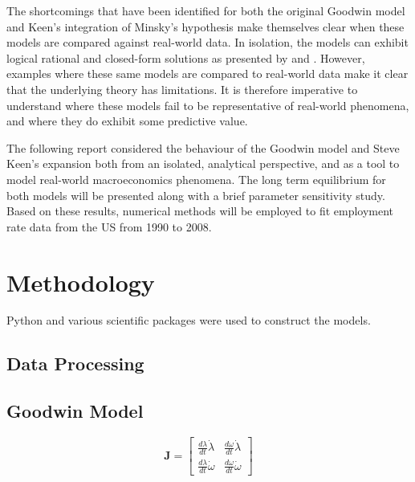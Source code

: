 \documentclass[12pt, centerh1]{article}
\begin{document}

\noindent The shortcomings that have been identified for both the original Goodwin model and Keen’s integration of Minsky’s hypothesis make themselves clear when these models are compared against real-world data. In isolation, the models can exhibit logical rational and closed-form solutions as presented by \citet{goodwin1982growth} and \citet{grasselli2012analysis}. However, examples where these same models are compared to real-world data \citep{harvie2000testing, moura2013testing} make it clear that the underlying theory has limitations. It is therefore imperative to understand where these models fail to be representative of real-world phenomena, and where they do exhibit some predictive value. 

\noindent The following report considered the behaviour of the Goodwin model and Steve Keen’s expansion both from an isolated, analytical perspective, and as a tool to model real-world macroeconomics phenomena. The long term equilibrium for both models will be presented along with a brief parameter sensitivity study. Based on these results, numerical methods will be employed to fit employment rate data from the US from 1990 to 2008.


\newpage %

\section{Methodology}
Python \citep{rossum1995python} and various scientific packages were used to construct the models.

\subsection{Data Processing}

\subsection{Goodwin Model}

\[
\mathbf J =
\begin{bmatrix}
    \frac{d\lambda}{dt}\dot{\lambda} & \frac{d\omega}{dt}\dot{\lambda}\\[1ex]
    \frac{d\lambda}{dt}\dot{\omega} & \frac{d\omega}{dt}\dot{\omega}
\end{bmatrix}
\]
\end{document}
